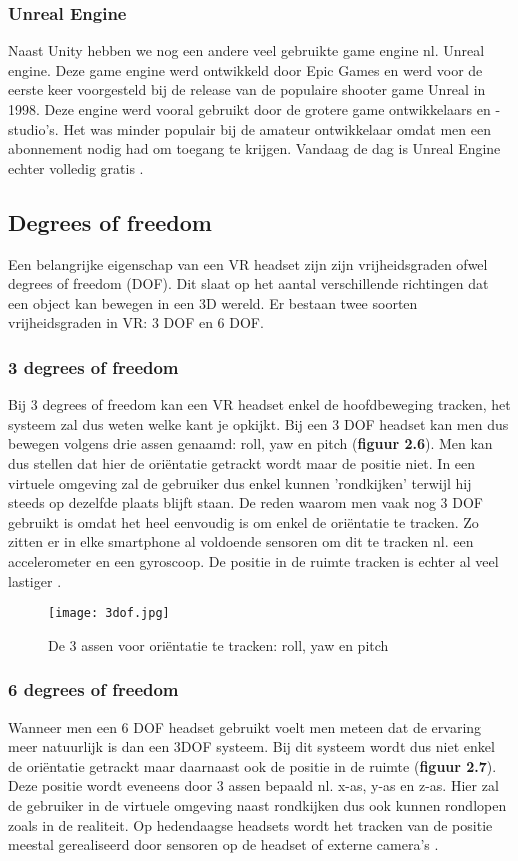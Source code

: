 \subsubsection{Unreal Engine}
Naast Unity hebben we nog een andere veel gebruikte game engine nl. Unreal engine. Deze game engine werd ontwikkeld door Epic Games en werd voor de eerste keer voorgesteld bij de release van de populaire shooter game Unreal in 1998. Deze engine werd vooral gebruikt door de grotere game ontwikkelaars en -studio's. Het was minder populair bij de amateur ontwikkelaar omdat men een abonnement nodig had om toegang te krijgen. Vandaag de dag is Unreal Engine echter volledig gratis \autocite{Sutorcen2016}.

\subsection{Degrees of freedom}

Een belangrijke eigenschap van een VR headset zijn zijn vrijheidsgraden ofwel degrees of freedom (DOF). Dit slaat op het aantal verschillende richtingen dat een object kan bewegen in een 3D wereld. Er bestaan twee soorten vrijheidsgraden in VR: 3 DOF en 6 DOF. 

\subsubsection{3 degrees of freedom}
Bij 3 degrees of freedom kan een VR headset enkel de hoofdbeweging tracken, het systeem zal dus weten welke kant je opkijkt. Bij een 3 DOF headset kan men dus bewegen volgens drie assen genaamd: roll, yaw en pitch (\textbf{figuur 2.6}). Men kan dus stellen dat hier de oriëntatie getrackt wordt maar de positie niet. In een virtuele omgeving zal de gebruiker dus enkel kunnen 'rondkijken' terwijl hij steeds op dezelfde plaats blijft staan. De reden waarom men vaak nog 3 DOF gebruikt is omdat het heel eenvoudig is om enkel de oriëntatie te tracken. Zo zitten er in elke smartphone al voldoende sensoren om dit te tracken nl. een accelerometer en een gyroscoop. De positie in de ruimte tracken is echter al veel lastiger \autocite{Weis2018}.

\begin{figure}[h]
    \centering
    \texttt{[image: 3dof.jpg]}
    \caption{De 3 assen voor oriëntatie te tracken: roll, yaw en pitch \autocite{Lang2013}}
\end{figure}

\subsubsection{6 degrees of freedom}
Wanneer men een 6 DOF headset gebruikt voelt men meteen dat de ervaring meer natuurlijk is dan een 3DOF systeem. Bij dit systeem wordt dus niet enkel de oriëntatie getrackt maar daarnaast ook de positie in de ruimte (\textbf{figuur 2.7}). Deze positie wordt eveneens door 3 assen bepaald nl. x-as, y-as en z-as. Hier zal de gebruiker in de virtuele omgeving naast rondkijken dus ook kunnen rondlopen zoals in de realiteit. Op hedendaagse headsets wordt het tracken van de positie meestal gerealiseerd door sensoren op de headset of externe camera's \autocite{Weis2018}.

